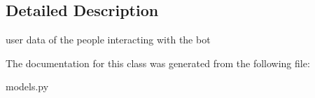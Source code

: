 \subsection{Detailed Description}
\begin{DoxyVerb}user data of the people interacting with the bot \end{DoxyVerb}
 

The documentation for this class was generated from the following file\+:\begin{DoxyCompactItemize}
\item 
models.\+py\end{DoxyCompactItemize}
